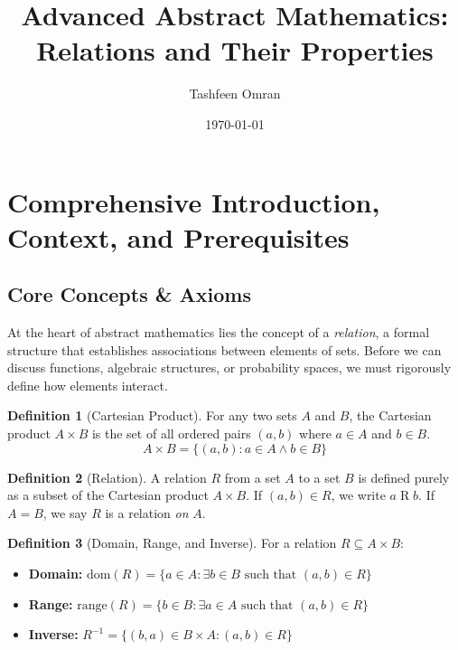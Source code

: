 \documentclass[11pt, a4paper]{article}
\title{\textbf{Advanced Abstract Mathematics: Relations and Their Properties}}
\author{Tashfeen Omran}
\date{\today}
\theoremstyle{definition}
\newtheorem{definition}{Definition}[section]
\theoremstyle{remark}
\newcommand{\dom}{\text{dom}}
\newcommand{\range}{\text{range}}
\begin{document}
\maketitle
\tableofcontents
\newpage

\section{Comprehensive Introduction, Context, and Prerequisites}

\subsection{Core Concepts \& Axioms}
At the heart of abstract mathematics lies the concept of a \textit{relation}, a formal structure that establishes associations between elements of sets. Before we can discuss functions, algebraic structures, or probability spaces, we must rigorously define how elements interact. 

\begin{definition}[Cartesian Product]
For any two sets $A$ and $B$, the Cartesian product $A \times B$ is the set of all ordered pairs $(a, b)$ where $a \in A$ and $b \in B$.
\[ A \times B = \{ (a, b) : a \in A \land b \in B \} \]
\end{definition}

\begin{definition}[Relation]
A relation $R$ from a set $A$ to a set $B$ is defined purely as a subset of the Cartesian product $A \times B$. If $(a, b) \in R$, we write $a \mathrel{R} b$. If $A = B$, we say $R$ is a relation \textit{on} $A$.
\end{definition}

\begin{definition}[Domain, Range, and Inverse]
For a relation $R \subseteq A \times B$:
\begin{itemize}
    \item \textbf{Domain:} $\dom(R) = \{ a \in A : \exists b \in B \text{ such that } (a, b) \in R \}$
    \item \textbf{Range:} $\range(R) = \{ b \in B : \exists a \in A \text{ such that } (a, b) \in R \}$
    \item \textbf{Inverse:} $R^{-1} = \{ (b, a) \in B \times A : (a, b) \in R \}$
\end{itemize}
\end{definition}
\end{document}
